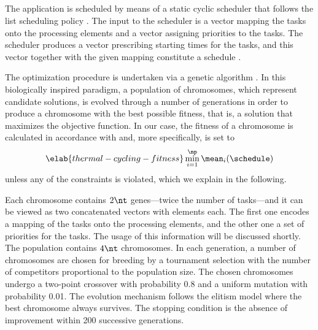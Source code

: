 \subsection{\solutiontitle}

The application is scheduled by means of a static cyclic scheduler that follows
the list scheduling policy \cite{adam1974}. The input to the scheduler is a
vector mapping the tasks onto the processing elements and a vector assigning
priorities to the tasks. The scheduler produces a vector prescribing starting
times for the tasks, and this vector together with the given mapping constitute
a schedule \schedule.

The optimization procedure is undertaken via a genetic algorithm
\cite{schmitz2004}. In this biologically inspired paradigm, a population of
chromosomes, which represent candidate solutions, is evolved through a number of
generations in order to produce a chromosome with the best possible fitness,
that is, a solution that maximizes the objective function. In our case, the
fitness of a chromosome is calculated in accordance with
 and, more specifically, is set to
\begin{equation} \elab{thermal-cycling-fitness}
  \min_{i = 1}^\np \mean_i(\schedule)
\end{equation}
unless any of the constraints is violated, which we explain in the following.

Each chromosome contains $2 \nt$ genes---twice the number of tasks---and it can
be viewed as two concatenated vectors with \nt elements each. The first one
encodes a mapping of the tasks onto the processing elements, and the other one a
set of priorities for the tasks. The usage of this information will be discussed
shortly. The population contains $4 \nt$ chromosomes. In each generation, a
number of chromosomes are chosen for breeding by a tournament selection with the
number of competitors proportional to the population size. The chosen
chromosomes undergo a two-point crossover with probability 0.8 and a uniform
mutation with probability 0.01. The evolution mechanism follows the elitism
model where the best chromosome always survives. The stopping condition is the
absence of improvement within 200 successive generations.

